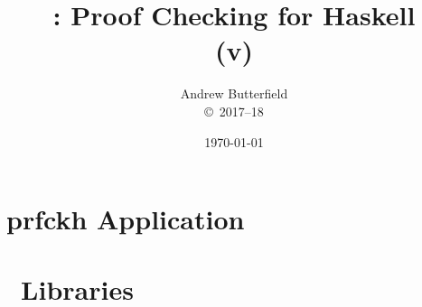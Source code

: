 \documentclass[fleqn,10pt]{report}
\author{
Andrew Butterfield
\\
{\small \copyright\ 2017--18}
}
\title{
  \prfchk: Proof Checking for Haskell
  \\(v\version)
}
\date{
\today
}
\begin{document}
\maketitle
\tableofcontents

\chapter{prfckh Application}




\chapter{\prfchk\ Libraries}


\newpage

\newpage

\newpage

\newpage

\end{document}
